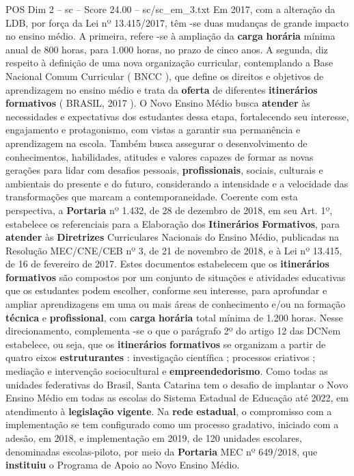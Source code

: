 \begin{textsample}{POS Dim 2 – sc – Score 24.00 – sc/sc\_em\_3.txt}
Em 2017, com a alteração da LDB, por força da Lei nº 13.415/2017, têm -se duas mudanças de grande impacto no ensino médio.
A primeira, refere -se à ampliação da \textbf{carga} \textbf{horária} mínima anual de 800 horas, para 1.000 horas, no prazo de cinco anos.
A segunda, diz respeito à definição de uma nova organização curricular, contemplando a Base Nacional Comum Curricular ( BNCC ), que define os direitos e objetivos de aprendizagem no ensino médio e trata da \textbf{oferta} de diferentes \textbf{itinerários} \textbf{formativos} ( BRASIL, 2017 ).
O Novo Ensino Médio busca \textbf{atender} às necessidades e expectativas dos estudantes dessa etapa, fortalecendo seu interesse, engajamento e protagonismo, com vistas a garantir sua permanência e aprendizagem na escola.
Também busca assegurar o desenvolvimento de conhecimentos, habilidades, atitudes e valores capazes de formar as novas gerações para lidar com desafios pessoais, \textbf{profissionais}, sociais, culturais e ambientais do presente e do futuro, considerando a intensidade e a velocidade das transformações que marcam a contemporaneidade.
Coerente com esta perspectiva, a \textbf{Portaria} nº 1.432, de 28 de dezembro de 2018, em seu Art. 1º, estabelece os referenciais para a Elaboração dos \textbf{Itinerários} \textbf{Formativos}, para \textbf{atender} às \textbf{Diretrizes} Curriculares Nacionais do Ensino Médio, publicadas na Resolução MEC/CNE/CEB nº 3, de 21 de novembro de 2018, e à Lei nº 13.415, de 16 de fevereiro de 2017.
Estes documentos estabelecem que os \textbf{itinerários} \textbf{formativos} são compostos por um conjunto de situações e atividades educativas que os estudantes podem escolher, conforme seu interesse, para aprofundar e ampliar aprendizagens em uma ou mais áreas de conhecimento e/ou na formação \textbf{técnica} e \textbf{profissional}, com \textbf{carga} \textbf{horária} total mínima de 1.200 horas.
Nesse direcionamento, complementa -se o que o parágrafo 2º do artigo 12 das DCNem estabelece, ou seja, que os \textbf{itinerários} \textbf{formativos} se organizam a partir de quatro eixos \textbf{estruturantes} : investigação científica ; processos criativos ; mediação e intervenção sociocultural e \textbf{empreendedorismo}.
Como todas as unidades federativas do Brasil, Santa Catarina tem o desafio de implantar o Novo Ensino Médio em todas as escolas do Sistema Estadual de Educação até 2022, em atendimento à \textbf{legislação} \textbf{vigente}.
Na \textbf{rede} \textbf{estadual}, o compromisso com a implementação se tem configurado como um processo gradativo, iniciado com a adesão, em 2018, e implementação em 2019, de 120 unidades escolares, denominadas escolas-piloto, por meio da \textbf{Portaria} MEC nº 649/2018, que \textbf{instituiu} o Programa de Apoio ao Novo Ensino Médio.

\end{textsample}
